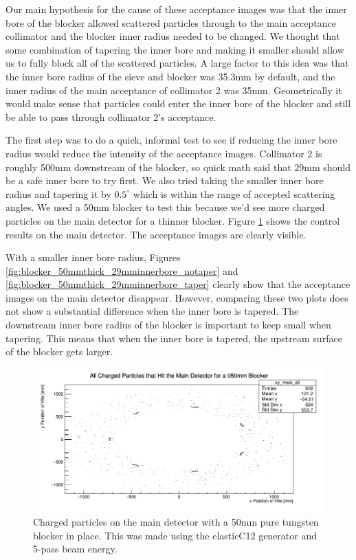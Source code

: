Our main hypothesis for the cause of these acceptance images was that the inner bore of the blocker allowed scattered particles through to the main acceptance collimator and the blocker inner radius needed to be changed. We thought that some combination of tapering the inner bore and making it smaller should allow us to fully block all of the scattered particles. A large factor to this idea was that the inner bore radius of the sieve and blocker was 35.3mm by default, and the inner radius of the main acceptance of collimator 2 was 35mm. Geometrically it would make sense that particles could enter the inner bore of the blocker and still be able to pass through collimator 2's acceptance.

The first step was to do a quick, informal test to see if reducing the inner bore radius would reduce the intensity of the acceptance images. Collimator 2 is roughly 500mm downstream of the blocker, so quick math said that 29mm should be a safe inner bore to try first. We also tried taking the smaller inner bore radius and tapering it by $0.5^{\circ}$ which is within the range of accepted scattering angles. We used a 50mm blocker to test this because we'd see more charged particles on the main detector for a thinner blocker. Figure \ref{fig:35mm_innerbore_50mmthick_blocker} shows the control results on the main detector. The acceptance images are clearly visible.

With a smaller inner bore radius, Figures \ref{fig:blocker_50mmthick_29mminnerbore_notaper} and \ref{fig:blocker_50mmthick_29mminnerbore_taper} clearly show that the acceptance images on the main detector disappear. However, comparing these two plots does not show a substantial difference when the inner bore is tapered. The downstream inner bore radius of the blocker is important to keep small when tapering. This means that when the inner bore is tapered, the upstream surface of the blocker gets larger.

\begin{figure}[H]
    \centering
    \includegraphics[scale=0.8]{Images/35mmInnerHoleCPMainDet.png}
    \caption{Charged particles on the main detector with a 50mm pure tungsten blocker in place. This was made using the elasticC12 generator and 5-pass beam energy.}
    \label{fig:35mm_innerbore_50mmthick_blocker}
\end{figure}

